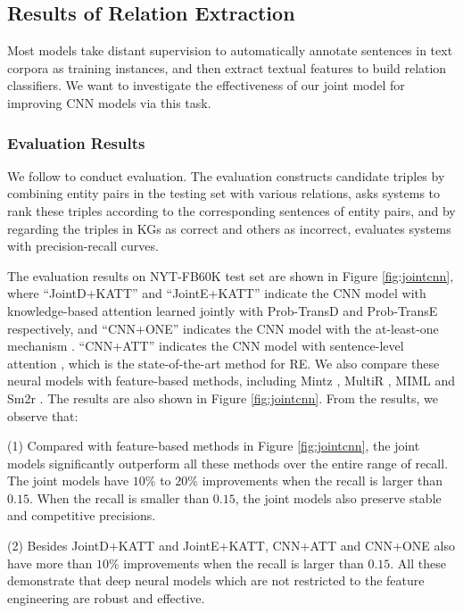 \documentclass[letterpaper]{article} %
\begin{document}
\subsection{Results of Relation Extraction}

Most models take distant supervision to automatically annotate sentences in text corpora as training instances, and then extract textual features to build relation classifiers. We want to investigate the effectiveness of our joint model for improving CNN models via this task.

\subsubsection{Evaluation Results}

We follow \cite{weston2013connecting} to conduct evaluation. The evaluation constructs candidate triples by combining entity pairs in the testing set with various relations, asks systems to rank these triples according to the corresponding sentences of entity pairs, and by regarding the triples in KGs as correct and others as incorrect, evaluates systems with precision-recall curves.

The evaluation results on NYT-FB60K test set are shown in Figure \ref{fig:jointcnn}, where ``JointD+KATT'' and ``JointE+KATT'' indicate the CNN model with knowledge-based attention learned jointly with Prob-TransD and Prob-TransE respectively, and ``CNN+ONE'' indicates the CNN model with the at-least-one mechanism \cite{zeng2015distant}. ``CNN+ATT'' indicates the CNN model with sentence-level attention \cite{lin2016neural}, which is the state-of-the-art method for RE. We also compare these neural models with feature-based methods, including Mintz \cite{mintz2009distant}, MultiR \cite{hoffmann2011knowledge}, MIML \cite{surdeanu2012multi} and Sm2r \cite{weston2013connecting}. The results are also shown in Figure \ref{fig:jointcnn}. From the results, we observe that: 

(1) Compared with feature-based methods in Figure \ref{fig:jointcnn}, the joint models significantly outperform all these methods over the entire range of recall. The joint models have $10\%$ to $20\%$ improvements when the recall is larger than $0.15$. When the recall is smaller than $0.15$, the joint models also preserve stable and competitive precisions. 

(2) Besides JointD+KATT and JointE+KATT, CNN+ATT and CNN+ONE also have more than $10\%$ improvements when the recall is larger than $0.15$. All these demonstrate that deep neural models which are not restricted to the feature engineering are robust and effective. 
\end{document}
